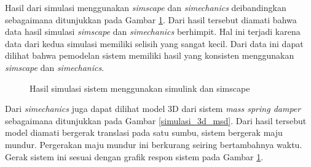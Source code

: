 \documentclass[../main.tex]{subfiles}
\begin{document}
                Hasil dari simulasi menggunakan \textit{simscape} dan \textit{simechanics} deibandingkan sebagaimana ditunjukkan pada Gambar \ref{hasil_simulasi_simulink_simscape}. Dari hasil tersebut diamati bahwa data hasil simulasi \textit{simscape} dan \textit{simechanics} berhimpit. Hal ini terjadi karena data dari kedua simulasi memiliki selisih yang sangat kecil. Dari data ini dapat dilihat bahwa pemodelan sistem memiliki hasil yang konsisten menggunakan \textit{simscape} dan \textit{simechanics}.
                \begin{figure}[H]
                    \caption{Hasil simulasi sistem menggunakan simulink dan simscape}
                    \label{hasil_simulasi_simulink_simscape}
                \end{figure}
                Dari \textit{simechanics} juga dapat dilihat model 3D dari sistem \textit{mass spring damper} sebagaimana ditunjukkan pada Gambar \ref{simulasi_3d_msd}. Dari hasil tersebut model diamati bergerak translasi pada satu sumbu, sistem bergerak maju mundur. Pergerakan maju mundur ini berkurang seiring bertambahnya waktu. Gerak sistem ini sesuai dengan grafik respon sistem pada Gambar \ref{hasil_simulasi_simulink_simscape}.
\end{document}
